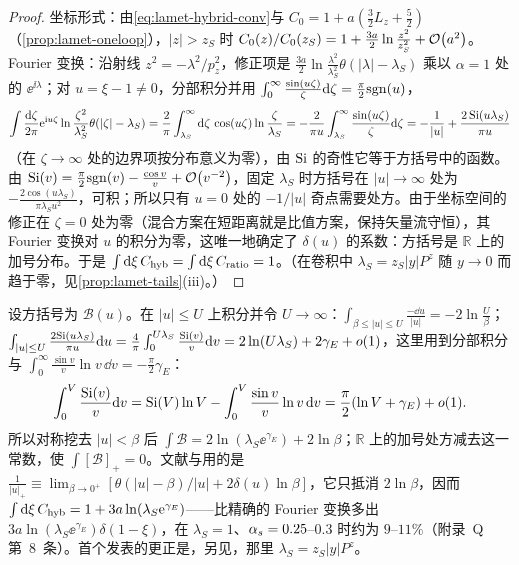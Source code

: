 \begin{proof}
坐标形式：由\cref{eq:lamet-hybrid-conv}与 $C_0=1+a(\frac32L_z+\frac52)$（\cref{prop:lamet-oneloop}），$|z|>z_S$ 时 $C_0(z)/C_0(z_S)=1+\frac{3a}2\ln\frac{z^2}{z_S^2}+\mathcal{O}\!\left(a^2\right)$。Fourier 变换：沿射线 $z^2=-\lambda^2/p_z^2$，修正项是 $\frac{3a}2\ln\frac{\lambda^2}{\lambda_S^2}\theta(|\lambda|-\lambda_S)$ 乘以 $\alpha=1$ 处的 $\ee^{\ii\lambda}$；对 $u=\xi-1\neq0$，分部积分并用 $\int_0^\infty\frac{\sin(u\zeta)}\zeta\mathrm{d}\zeta=\frac\pi2{\rm sgn}(u)$，
\[
\int\frac{\mathrm{d}\zeta}{2\pi}\mathrm{e}^{\mathrm{i} u\zeta}\ln\frac{\zeta^2}{\lambda_S^2}\theta(|\zeta|-\lambda_S)=\frac2\pi\int_{\lambda_S}^\infty\mathrm{d}\zeta\,\cos(u\zeta)\ln\frac\zeta{\lambda_S}=-\frac2{\pi u}\int_{\lambda_S}^\infty\frac{\sin(u\zeta)}\zeta\mathrm{d}\zeta=-\frac1{|u|}+\frac{2\,{\rm Si}(u\lambda_S)}{\pi u}
\]
（在 $\zeta\to\infty$ 处的边界项按分布意义为零），由 ${\rm Si}$ 的奇性它等于方括号中的函数。由 ${\rm Si}(v)=\frac\pi2{\rm sgn}(v)-\frac{\cos v}v+\mathcal{O}\!\left(v^{-2}\right)$，固定 $\lambda_S$ 时方括号在 $|u|\to\infty$ 处为 $-\frac{2\cos(u\lambda_S)}{\pi\lambda_Su^2}$，可积；所以只有 $u=0$ 处的 $-1/|u|$ 奇点需要处方。由于坐标空间的修正在 $\zeta=0$ 处为零（混合方案在短距离就是比值方案，保持矢量流守恒），其 Fourier 变换对 $u$ 的积分为零，这唯一地确定了 $\delta(u)$ 的系数：方括号是 $\mathbb R$ 上的加号分布。于是 $\int\mathrm{d}\xi\,C_{\rm hyb}=\int\mathrm{d}\xi\,C_{\rm ratio}=1$。（在卷积中 $\lambda_S=z_S|y|P^z$ 随 $y\to0$ 而趋于零，见\cref{prop:lamet-tails}(iii)。）
\end{proof}

\begin{example}[混合核的归一化]\label{ex:lamet-hybrid-normalization}
设方括号为 $\mathcal B(u)$。在 $|u|\le U$ 上积分并令 $U\to\infty$：$\int_{\beta\le|u|\le U}\frac{-\dd u}{|u|}=-2\ln\frac U\beta$；$\int_{|u|\le U}\frac{2{\rm Si}(u\lambda_S)}{\pi u}\mathrm{d} u=\frac4\pi\int_0^{U\lambda_S}\frac{{\rm Si}(v)}v\mathrm{d} v=2\ln(U\lambda_S)+2\gamma_E+o(1)$，这里用到分部积分与 $\int_0^\infty\frac{\sin v}v\ln v\,\dd v=-\frac\pi2\gamma_E$：
\[
\int_0^V\frac{{\rm Si}(v)}v\mathrm{d} v={\rm Si}(V)\ln V-\int_0^V\frac{\sin v}v\ln v\,\mathrm{d} v=\frac\pi2(\ln V+\gamma_E)+o(1).
\]
所以对称挖去 $|u|<\beta$ 后 $\int\mathcal B=2\ln(\lambda_S\ee^{\gamma_E})+2\ln\beta$；$\mathbb R$ 上的加号处方减去这一常数，使 $\int[\mathcal B]_+=0$。文献\cite[式~(33)--(34)]{Ji:2020brr}与\cite[式~(120)--(121)]{JiEtAl2021}用的是 $\frac1{|u|_+}\equiv\lim_{\beta\to0^+}[\theta(|u|-\beta)/|u|+2\delta(u)\ln\beta]$，它只抵消 $2\ln\beta$，因而 $\int\mathrm{d}\xi\,C_{\rm hyb}=1+3a\ln(\lambda_S\mathrm{e}^{\gamma_E})$——比精确的 Fourier 变换多出 $3a\ln(\lambda_S\ee^{\gamma_E})\delta(1-\xi)$，在 $\lambda_S=1$、$\alpha_s=0.25$–$0.3$ 时约为 $9$–$11\%$（附录~Q 第~8~条）。首个发表的更正是\cite[式~(35)]{Chou:2022drv}，另见\cite[式~(A.14)]{Su:2022fiu}，那里 $\lambda_S=z_S|y|P^z$。
\end{example}

